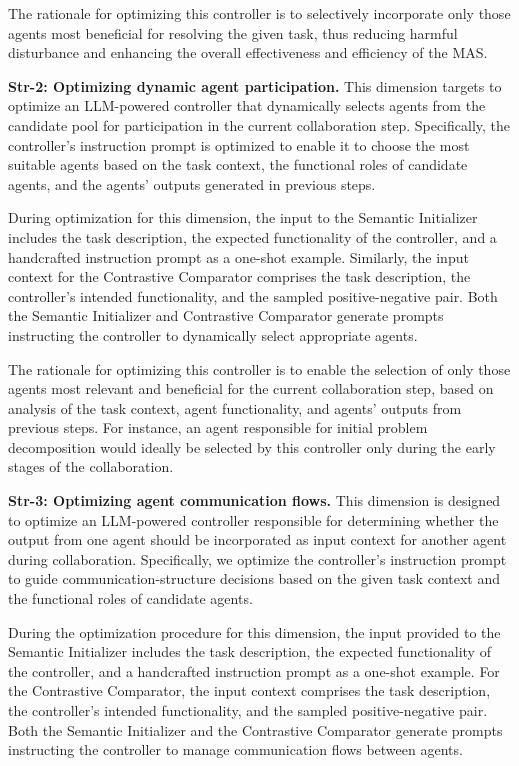 The rationale for optimizing this controller is to selectively incorporate only those agents most beneficial for resolving the given task, thus reducing harmful disturbance and enhancing the overall effectiveness and efficiency of the MAS.



\noindent \textbf{Str-2: Optimizing dynamic agent participation.} This dimension targets to optimize an LLM-powered controller that dynamically selects agents from the candidate pool for participation in the current collaboration step. Specifically, the controller's instruction prompt is optimized to enable it to choose the most suitable agents based on the task context, the functional roles of candidate agents, and the agents' outputs generated in previous steps. 

During optimization for this dimension, the input to the Semantic Initializer includes the task description, the expected functionality of the controller, and a handcrafted instruction prompt as a one-shot example. Similarly, the input context for the Contrastive Comparator comprises the task description, the controller’s intended functionality, and the sampled positive-negative pair. Both the Semantic Initializer and Contrastive Comparator generate prompts instructing the controller to dynamically select appropriate agents. 

The rationale for optimizing this controller is to enable the selection of only those agents most relevant and beneficial for the current collaboration step, based on analysis of the task context, agent functionality, and agents' outputs from previous steps. For instance, an agent responsible for initial problem decomposition would ideally be selected by this controller only during the early stages of the collaboration.


\noindent \textbf{Str-3: Optimizing agent communication flows.} This dimension is designed to optimize an LLM-powered controller responsible for determining whether the output from one agent should be incorporated as input context for another agent during collaboration. Specifically, we optimize the controller's instruction prompt to guide communication-structure decisions based on the given task context and the functional roles of candidate agents.


During the optimization procedure for this dimension, the input provided to the Semantic Initializer includes the task description, the expected functionality of the controller, and a handcrafted instruction prompt as a one-shot example. For the Contrastive Comparator, the input context comprises the task description, the controller’s intended functionality, and the sampled positive-negative pair. Both the Semantic Initializer and the Contrastive Comparator generate prompts instructing the controller to manage communication flows between agents.

